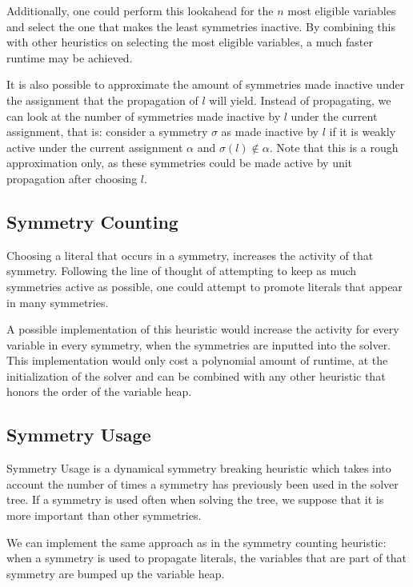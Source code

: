 	Additionally, one could perform this lookahead for the $n$ most eligible variables
	and select the one that makes the least symmetries inactive.
	By combining this with other heuristics on selecting the most eligible variables,
	a much faster runtime may be achieved.

		It is also possible to approximate the amount of symmetries made inactive under the
		assignment that the propagation of $l$ will yield.
		Instead of propagating, we can look at the number of symmetries made inactive by $l$
		under the current assignment, that is: consider a symmetry $\sigma$ as
		made inactive by $l$ if it is weakly active under the current assignment $\alpha$ and
		$\sigma(l) \notin \alpha$.
		Note that this is a rough approximation only, as these symmetries could be made active by
		unit propagation after choosing $l$.

\subsection{Symmetry Counting}

	Choosing a literal that occurs in a symmetry, increases the activity of that symmetry.
	Following the line of thought of attempting to keep as much symmetries active as possible,
	one could attempt to promote literals that appear in many symmetries.

	A possible implementation of this heuristic would increase the activity for every variable in
	every symmetry, when the symmetries are inputted into the solver.
	This implementation would only cost a polynomial amount of runtime, at the initialization of the
	solver and can be combined with any other heuristic that honors the order of the variable heap.

\subsection{Symmetry Usage}
	Symmetry Usage is a dynamical symmetry breaking heuristic
	which takes into account the number of times a symmetry has previously been used in the solver tree.
	If a symmetry is used often when solving the tree, we suppose that it is more important than other symmetries.

	We can implement the same approach as in the symmetry counting heuristic: when a symmetry is
	used to propagate literals, the variables that are part of that symmetry are bumped up the
	variable heap.

